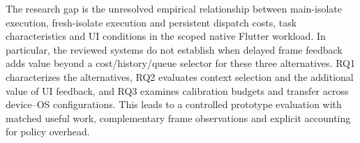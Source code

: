 \documentclass[14pt,a4paper,oneside]{extreport}
\begin{document}
The research gap is the unresolved empirical relationship between main-isolate execution,
fresh-isolate execution and persistent dispatch costs, task characteristics and UI conditions
in the scoped native Flutter workload. In particular, the reviewed systems do not establish
when delayed frame feedback adds value beyond a cost/history/queue selector for these three
alternatives. RQ1 characterizes the alternatives, RQ2
evaluates context selection and the additional value of UI feedback, and RQ3 examines
calibration budgets and transfer across device--OS configurations. This leads to a controlled
prototype evaluation with matched useful
work, complementary frame observations and explicit accounting for policy overhead.
\clearpage
{}
\begingroup
\setlength{\bibsep}{0.35\baselineskip}
\end{document}
